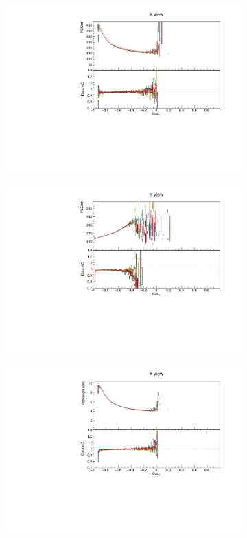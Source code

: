 \begin{figure}[!ht]
\begin{subfigure}{0.495\textwidth}
  \end{subfigure}
  \begin{subfigure}{0.495\textwidth}
    \includegraphics[width=\linewidth]{PlotsAngularDistribution/pecorr_cosy_x.pdf}
  \end{subfigure}
  \begin{subfigure}{0.495\textwidth}
    \includegraphics[width=\linewidth]{PlotsAngularDistribution/pecorr_cosy_y.pdf}
  \end{subfigure}
  \begin{subfigure}{0.495\textwidth}
    \includegraphics[width=\linewidth]{PlotsAngularDistribution/cm_cosy_x.pdf}

\end{subfigure}
\end{figure}
